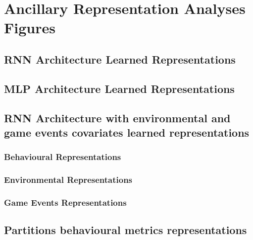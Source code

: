 \chapter{Ancillary Representation Analyses Figures}

\section{RNN Architecture Learned Representations}
\label{rnn_architecture_representations}

\section{MLP Architecture Learned Representations}
\label{mlp_architecture_representations}

\section{RNN Architecture with environmental and game events covariates learned representations}
\label{rnn_env_even_architecture_representations}

\subsection{Behavioural Representations}

\subsection{Environmental Representations}

\subsection{Game Events Representations}

\section{Partitions behavioural metrics representations}
\label{partitions_behavioural}

